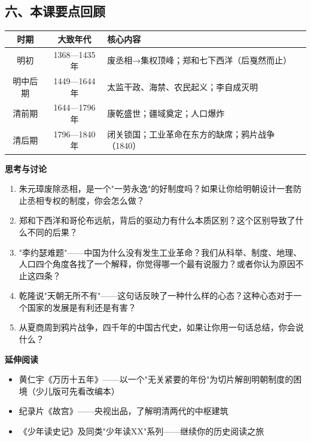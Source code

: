 \documentclass[a4paper,12pt]{ctexart}
\begin{document}
\subsection*{六、本课要点回顾}

\begin{center}
\begin{tabular}{|c|c|p{8cm}|}
\hline
\textbf{时期} & \textbf{大致年代} & \textbf{核心内容} \\
\hline
明初 & 1368—1435年 & 废丞相→集权顶峰；郑和七下西洋（后戛然而止） \\
\hline
明中后期 & 1449—1644年 & 太监干政、海禁、农民起义；李自成灭明 \\
\hline
清前期 & 1644—1796年 & 康乾盛世；疆域奠定；人口爆炸 \\
\hline
清后期 & 1796—1840年 & 闭关锁国；工业革命在东方的缺席；鸦片战争（1840） \\
\hline
\end{tabular}
\end{center}

{\large\textcolor{orange!80!black}{\textbf{思考与讨论}}}
\begin{enumerate}
  \item 朱元璋废除丞相，是一个"一劳永逸"的好制度吗？如果让你给明朝设计一套防止丞相专权的制度，你会怎么做？
  \item 郑和下西洋和哥伦布远航，背后的驱动力有什么本质区别？这个区别导致了什么不同的后果？
  \item "李约瑟难题"——中国为什么没有发生工业革命？我们从科举、制度、地理、人口四个角度各找了一个解释，你觉得哪一个最有说服力？或者你认为原因不止这四条？
  \item 乾隆说"天朝无所不有"——这句话反映了一种什么样的心态？这种心态对于一个国家的发展是有利还是有害？
  \item 从夏商周到鸦片战争，四千年的中国古代史，如果让你用一句话总结，你会说什么？
\end{enumerate}

\vspace{0.3cm}
\textcolor{blue!70!black}{\textbf{延伸阅读}}
\begin{itemize}
  \item 黄仁宇《万历十五年》——以一个"无关紧要的年份"为切片解剖明朝制度的困境（少儿版可先看改编本）
  \item 纪录片《故宫》——央视出品，了解明清两代的中枢建筑
  \item 《少年读史记》及同类"少年读XX"系列——继续你的历史阅读之旅
\end{itemize}
\end{document}
